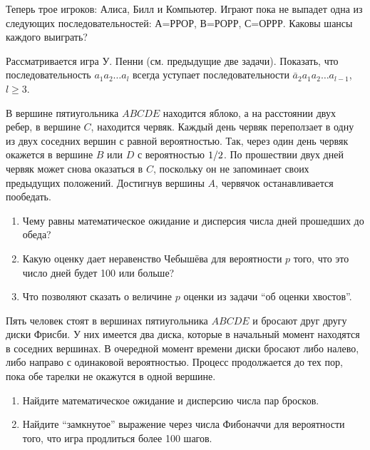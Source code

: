 \begin{problem}
Теперь трое игроков: Алиса, Билл и Компьютер. Играют пока 
не выпадет одна из следующих последовательностей: А=РРОР, В=РОРР, С=ОРРР. 
Каковы шансы каждого выиграть?
\end{problem}


\begin{problem}
Рассматривается игра У. Пенни (см. предыдущие две задачи). Показать, что 
последовательность $a_1 a_2 \ldots a_l $ всегда уступает последовательности 
$\bar {a}_2 a_1 a_2 \ldots a_{l-1} $, $l\ge 3$.
\end{problem}


\begin{problem}
В вершине пятиугольника $ABCDE$ 
находится яблоко, а на расстоянии двух ребер, в вершине $C$, находится 
червяк. Каждый день червяк переползает в одну из двух соседних вершин с 
равной вероятностью. Так, через один день червяк окажется в вершине $B$ или 
$D$ с вероятностью $1 \mathord{\left/ {\vphantom {1 2}} \right. 
\kern-\nulldelimiterspace} 2$. По прошествии двух дней червяк может снова 
оказаться в $C$, поскольку он не запоминает своих предыдущих положений. 
Достигнув вершины $A$, червячок останавливается пообедать.

\begin{enumerate}
\item Чему равны математическое ожидание и дисперсия числа дней прошедших до обеда?
\item Какую оценку дает неравенство Чебышёва для вероятности $p$ того, что это число дней будет 100 или больше?
\item Что позволяют сказать о величине $p$ оценки из задачи ``об оценки хвостов''.
\end{enumerate}
\end{problem}


\begin{problem}
Пять человек стоят в вершинах пятиугольника $ABCDE$ и 
бросают друг другу диски Фрисби. У них имеется два диска, которые в 
начальный момент находятся в соседних вершинах. В очередной момент времени 
диски бросают либо налево, либо направо с одинаковой вероятностью. Процесс 
продолжается до тех пор, пока обе тарелки не окажутся в одной вершине.

\begin{enumerate}
\item Найдите математическое ожидание и дисперсию числа пар бросков.
\item Найдите ``замкнутое'' выражение через числа Фибоначчи для вероятности того, что игра продлиться более 100 шагов.
\end{enumerate}
\end{problem}


